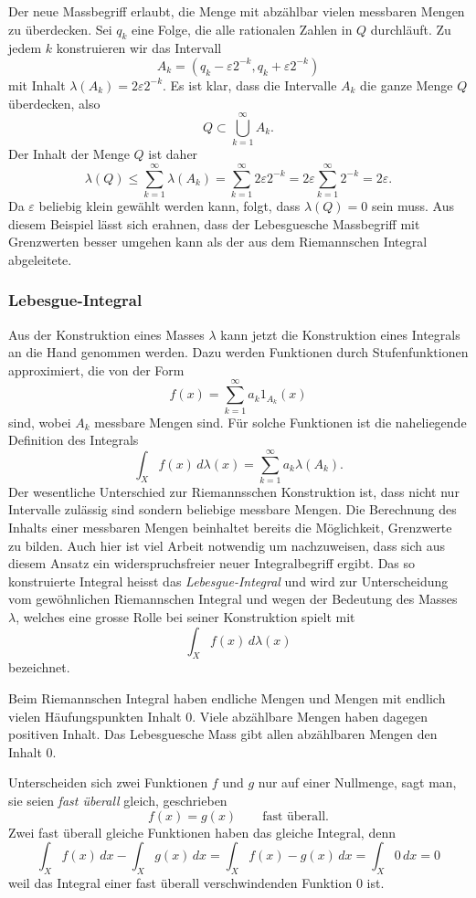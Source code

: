 Der neue Massbegriff erlaubt, die Menge mit abzählbar vielen messbaren
Mengen zu überdecken.
Sei $q_k$ eine Folge, die alle rationalen Zahlen in $Q$ durchläuft.
Zu jedem $k$ konstruieren wir das Intervall
\[
A_k = (q_k-\varepsilon2^{-k},q_k+\varepsilon2^{-k})
\]
mit Inhalt $\lambda(A_k) = 2\varepsilon2^{-k}$.
Es ist klar, dass die Intervalle $A_k$ die ganze Menge $Q$ überdecken,
also
\[
Q\subset \bigcup_{k=1}^\infty A_k.
\]
Der Inhalt der Menge $Q$ ist daher
\[
\lambda(Q)
\le
\sum_{k=1}^\infty \lambda(A_k)
=
\sum_{k=1}^\infty 2\varepsilon 2^{-k}
=
2\varepsilon
\sum_{k=1}^\infty 2^{-k}
=
2\varepsilon.
\]
Da $\varepsilon$ beliebig klein gewählt werden kann, folgt, dass
$\lambda(Q)=0$ sein muss.
Aus diesem Beispiel lässt sich erahnen, dass der Lebesguesche Massbegriff
mit Grenzwerten besser umgehen kann als der aus dem Riemannschen Integral
abgeleitete.

%
%
\subsubsection{Lebesgue-Integral}
Aus der Konstruktion eines Masses $\lambda$ kann jetzt die Konstruktion
eines Integrals an die Hand genommen werden.
Dazu werden Funktionen durch Stufenfunktionen approximiert, die
von der Form
\[
f(x) = \sum_{k=1}^\infty a_k 1_{A_k}(x)
\]
sind, wobei $A_k$ messbare Mengen sind.
Für solche Funktionen ist die naheliegende Definition des Integrals
\[
\int_X f(x)\,d\lambda(x)
=
\sum_{k=1}^\infty a_k \lambda(A_k).
\]
Der wesentliche Unterschied zur Riemannsschen Konstruktion ist,
dass nicht nur Intervalle zulässig sind sondern beliebige messbare Mengen.
Die Berechnung des Inhalts einer messbaren Mengen beinhaltet bereits
die Möglichkeit, Grenzwerte zu bilden.
Auch hier ist viel Arbeit notwendig um nachzuweisen, dass sich aus diesem
Ansatz ein widerspruchsfreier neuer Integralbegriff ergibt.
Das so konstruierte Integral heisst das {\em Lebesgue-Integral} und
%
wird zur Unterscheidung vom gewöhnlichen Riemannschen Integral und
wegen der Bedeutung des Masses $\lambda$, welches eine grosse Rolle
bei seiner Konstruktion spielt mit
\[
\int_X f(x) \,d\lambda(x)
\]
bezeichnet.

Beim Riemannschen Integral haben endliche Mengen und Mengen mit endlich
vielen Häufungspunkten Inhalt $0$.
Viele abzählbare Mengen haben dagegen positiven Inhalt.
Das Lebesguesche Mass gibt allen abzählbaren Mengen den Inhalt 0.

Unterscheiden sich zwei Funktionen $f$ und $g$ nur auf einer Nullmenge,
sagt man, sie seien {\em fast überall} gleich, geschrieben
\[
f(x) = g(x) \qquad \text{fast überall}.
\]
Zwei fast überall gleiche Funktionen haben das gleiche Integral, denn
\[
\int_X f(x)\,dx - \int_X g(x)\,dx
=
\int_X f(x)-g(x)\,dx
=
\int_X 0\,dx=0
\]
weil das Integral einer fast überall verschwindenden Funktion $0$ ist.

